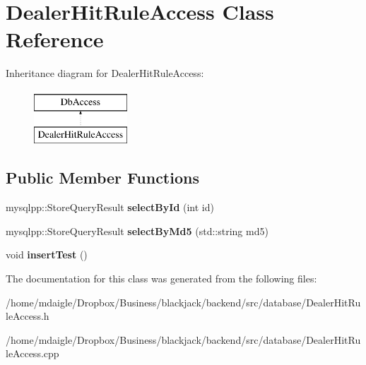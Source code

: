 \hypertarget{classDealerHitRuleAccess}{
\section{\-Dealer\-Hit\-Rule\-Access \-Class \-Reference}
\label{classDealerHitRuleAccess}
}
\-Inheritance diagram for \-Dealer\-Hit\-Rule\-Access\-:\begin{figure}[H]
\begin{center}
\leavevmode
\includegraphics[height=2.000000cm]{classDealerHitRuleAccess}
\end{center}
\end{figure}
\subsection*{\-Public \-Member \-Functions}
\begin{DoxyCompactItemize}
\item 
\hypertarget{classDealerHitRuleAccess_a976c67a9a98d475a325c8662591bf55d}{
mysqlpp\-::\-Store\-Query\-Result {\bfseries select\-By\-Id} (int id)}
\label{classDealerHitRuleAccess_a976c67a9a98d475a325c8662591bf55d}

\item 
\hypertarget{classDealerHitRuleAccess_a9af401eb5ec4373275fc22bb60db9374}{
mysqlpp\-::\-Store\-Query\-Result {\bfseries select\-By\-Md5} (std\-::string md5)}
\label{classDealerHitRuleAccess_a9af401eb5ec4373275fc22bb60db9374}

\item 
\hypertarget{classDealerHitRuleAccess_ad2983b641da02684460240a9fdd050f1}{
void {\bfseries insert\-Test} ()}
\label{classDealerHitRuleAccess_ad2983b641da02684460240a9fdd050f1}

\end{DoxyCompactItemize}


\-The documentation for this class was generated from the following files\-:\begin{DoxyCompactItemize}
\item 
/home/mdaigle/\-Dropbox/\-Business/blackjack/backend/src/database/\-Dealer\-Hit\-Rule\-Access.\-h\item 
/home/mdaigle/\-Dropbox/\-Business/blackjack/backend/src/database/\-Dealer\-Hit\-Rule\-Access.\-cpp\end{DoxyCompactItemize}
